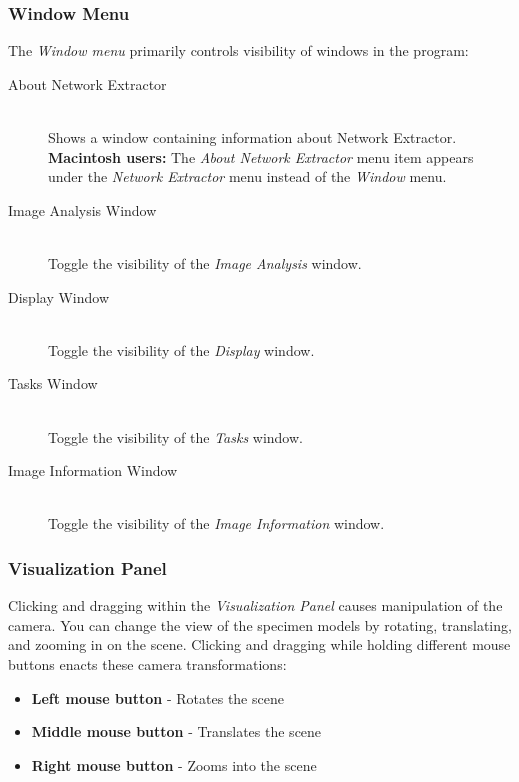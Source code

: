 \documentclass[11pt,titlepage,twoside]{article}
\begin{document}
\subsubsection{Window Menu}

The \emph{Window menu} primarily controls visibility of windows in the program:

\begin{description}

  \item[About Network Extractor] \hfill \\
  Shows a window containing information about Network Extractor. \textbf{Macintosh users:} The \emph{About Network Extractor} menu item appears under the \emph{Network Extractor} menu instead of the \emph{Window} menu. 

  \item[Image Analysis Window] \hfill \\
  Toggle the visibility of the \emph{Image Analysis} window.
  
  \item[Display Window] \hfill \\
  Toggle the visibility of the \emph{Display} window.
  
  \item[Tasks Window] \hfill \\
  Toggle the visibility of the \emph{Tasks} window.
  
  \item[Image Information Window] \hfill \\
  Toggle the visibility of the \emph{Image Information} window.

\end{description}

\subsubsection{Visualization Panel}

Clicking and dragging within the \emph{Visualization Panel} causes manipulation of the camera. You can change the view of the specimen models by rotating, translating, and zooming in
on the scene. Clicking and dragging while holding different mouse buttons enacts these camera transformations:

\begin{itemize}

\item \textbf{Left mouse button} - Rotates the scene

\item \textbf{Middle mouse button} - Translates the scene

\item \textbf{Right mouse button} - Zooms into the scene

\end{itemize}
\end{document}
